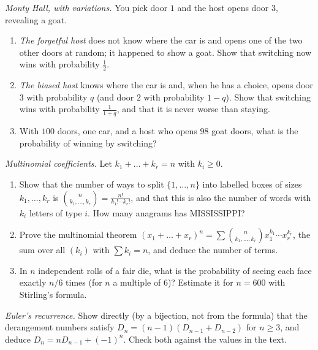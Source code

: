 \begin{exercise}[$\star$]\label{ex:monty}
\emph{Monty Hall, with variations.} You pick door $1$ and the host opens door $3$, revealing a goat.
\begin{enumerate}[label=(\alph*)]
\item \emph{The forgetful host} does not know where the car is and opens one of the two other doors at random; it happened to show a goat. Show that switching now wins with probability $\frac12$.
\item \emph{The biased host} knows where the car is and, when he has a choice, opens door $3$ with probability $q$ (and door $2$ with probability $1-q$). Show that switching wins with probability $\frac1{1+q}$, and that it is never worse than staying.
\item With $100$ doors, one car, and a host who opens $98$ goat doors, what is the probability of winning by switching?
\end{enumerate}
\end{exercise}

\begin{exercise}[$\star$]\label{ex:multinomial}
\emph{Multinomial coefficients.} Let $k_1+\dots+k_r=n$ with $k_i\ge0$.
\begin{enumerate}[label=(\alph*)]
\item Show that the number of ways to split $\{1,\dots,n\}$ into labelled boxes of sizes $k_1,\dots,k_r$ is $\binom n{k_1,\dots,k_r}=\frac{n!}{k_1!\cdots k_r!}$, and that this is also the number of words with $k_i$ letters of type $i$. How many anagrams has MISSISSIPPI?
\item Prove the multinomial theorem $(x_1+\dots+x_r)^n=\sum\binom n{k_1,\dots,k_r}x_1^{k_1}\cdots x_r^{k_r}$, the sum over all $(k_i)$ with $\sum k_i=n$, and deduce the number of terms.
\item In $n$ independent rolls of a fair die, what is the probability of seeing each face exactly $n/6$ times (for $n$ a multiple of $6$)? Estimate it for $n=600$ with Stirling's formula.
\end{enumerate}
\end{exercise}

\begin{exercise}[$\star\star$]\label{ex:derangrec}
\emph{Euler's recurrence.} Show directly (by a bijection, not from the formula) that the derangement numbers satisfy $D_n=(n-1)(D_{n-1}+D_{n-2})$ for $n\ge3$, and deduce $D_n=nD_{n-1}+(-1)^n$. Check both against the values in the text.
\end{exercise}

